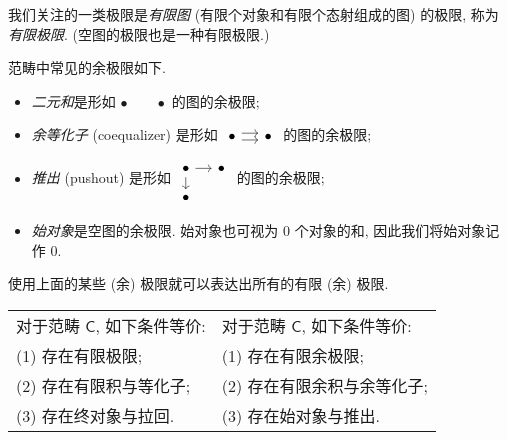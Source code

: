我们关注的一类极限是\emph{有限图} (有限个对象和有限个态射组成的图) 的极限, 称为\emph{有限极限}. (空图的极限也是一种有限极限.)

范畴中常见的余极限如下.
\begin{itemize}
    \item \emph{二元和}是形如 $\bullet\qquad \bullet$ 的图的余极限;
    \item \emph{余等化子} (coequalizer) 是形如 $\begin{tikzcd}[ampersand replacement=\&,sep=small]
	\bullet \& \bullet
	\arrow[shift left=1, from=1-1, to=1-2]
	\arrow[shift right=1, from=1-1, to=1-2]
\end{tikzcd}$ 的图的余极限;
    \item \emph{推出} (pushout) 是形如 $\begin{tikzcd}[ampersand replacement=\&,sep=small]
	\bullet \& \bullet \\
	\bullet \&
	\arrow[from=1-1, to=2-1]
	\arrow[from=1-1, to=1-2]
\end{tikzcd}$ 的图的余极限;
    \item \emph{始对象}是空图的余极限. 始对象也可视为 $0$ 个对象的和, 因此我们将始对象记作 $0$.
\end{itemize}

使用上面的某些 (余) 极限就可以表达出所有的有限 (余) 极限.

\begin{prop}
    [label={finite-limits-equivalent-condition}]
    {}
    \setlength{\tabcolsep}{12pt}
    \renewcommand{\arraystretch}{1.5}
    \begin{center}
    	\begin{tabular}{l|l}
    		对于范畴 $\mathsf C$, 如下条件等价: \quad & 对于范畴 $\mathsf C$, 如下条件等价: \\
    		(1) 存在有限极限\footnotemark; & (1) 存在有限余极限; \\
    		(2) 存在有限积与等化子; &  (2) 存在有限余积与余等化子;\\
    		(3) 存在终对象与拉回. & (3) 存在始对象与推出.
    	\end{tabular}
    \end{center}
\end{prop}


